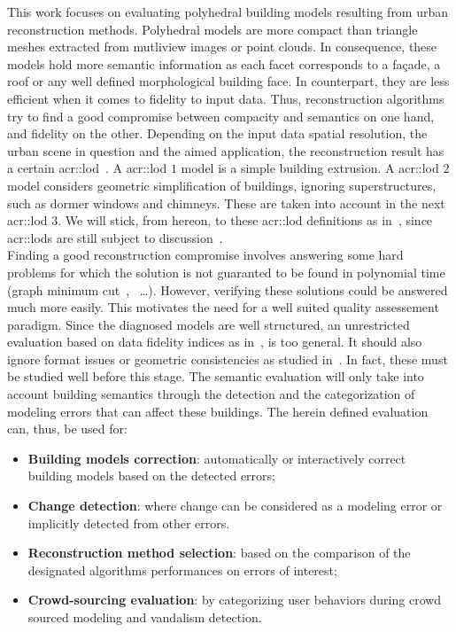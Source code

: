 \documentclass[runningheads]{llncs}
\begin{document}
    This work focuses on evaluating polyhedral building models resulting from urban reconstruction methods. Polyhedral models are more compact than triangle meshes extracted from mutliview images or point clouds. In consequence, these models hold more semantic information as each facet corresponds to a fa\c{c}ade, a roof or any well defined morphological building face. In counterpart, they are less efficient when it comes to fidelity to input data. Thus, reconstruction algorithms try to find a good compromise between compacity and semantics on one hand, and fidelity on the other. Depending on the input data spatial resolution, the urban scene in question and the aimed application, the reconstruction result has a certain \acrfull{acr::lod}~\cite{kolbe2005citygml}. A \acrshort{acr::lod} $1$ model is a simple building extrusion. A \acrshort{acr::lod} $2$ model considers geometric simplification of buildings, ignoring superstructures, such as dormer windows and chimneys. These are taken into account in the next \acrshort{acr::lod} $3$. We will stick, from hereon, to these \acrshort{acr::lod} definitions as in~\cite{verdie2015lod}, since \glspl{acr::lod} are still subject to discussion~\cite{2016_ceus_improved_lod}.\\

     Finding a good reconstruction compromise involves answering some hard problems for which the solution is not guaranted to be found in polynomial time {\color{blue}(graph minimum cut~\cite{Taillandier2005},~\cite{Bredif2008} \dots)}. However, verifying these solutions could be answered much more easily. This motivates the need for a well suited quality assessement paradigm. Since the diagnosed models are well structured, an unrestricted evaluation based on data fidelity indices as in~\cite{berger2013benchmark}, is too general. It should also ignore format issues or geometric consistencies as studied in~\cite{ledoux2018val3dity}. In fact, these must be studied well before this stage. The semantic evaluation will only take into account building semantics through the detection and the categorization of modeling errors that can affect these buildings. The herein defined evaluation can, thus, be used for:
    \begin{itemize}
        \item \textbf{Building models correction}: automatically or interactively correct building models based on the detected errors;
        \item \textbf{Change detection}: where change can be considered as a modeling error or implicitly detected from other errors.
        \item \textbf{Reconstruction method selection}: based on the comparison of the designated algorithms performances on errors of interest;
        \item \textbf{Crowd-sourcing evaluation}: by categorizing user behaviors during crowd sourced modeling and vandalism detection.
    \end{itemize}
    
\end{document}

